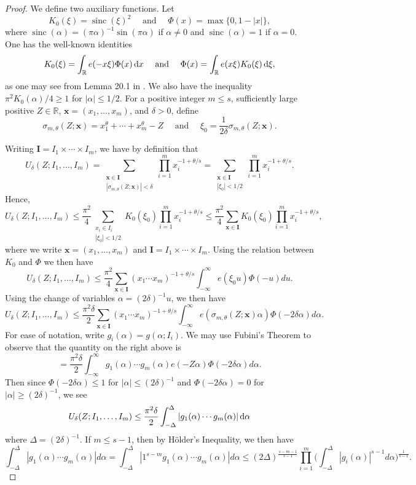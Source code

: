 \documentclass[11pt,reqno]{amsart}
\numberwithin{equation}{section}
\renewcommand{\d}{\,{\rm d}}
\begin{document}
\begin{proof}
We define two auxiliary functions. Let 
\[ K_0(\xi) = \operatorname{sinc}(\xi)^2 \quad \text{ and } \quad \Phi(x) = \max\{0, 1-|x| \}, \]
where $\operatorname{sinc}(\alpha) = (\pi \alpha)^{-1}\sin(\pi\alpha)$ if $\alpha \neq 0$ and $\operatorname{sinc}(\alpha) = 1$ if $\alpha=0$. One has the well-known identities
\[ K_0(\xi) = \int_{\mathbb{R}} e(-x\xi)\Phi(x)\d x \quad \text{ and } \quad \Phi(x) = \int_{\mathbb{R}} e(x\xi)K_0(\xi)\d\xi, \]
as one may see from Lemma 20.1 in \cite{DavBook}. We also have the inequality $\pi^2K_0(\alpha)/4 \geq 1$ for $|\alpha|\leq 1/2$. For a positive integer $m \leq s$, sufficiently large positive $Z \in \mathbb{R}$, $\mathbf{x} = (x_1,\ldots,x_m)$,  and $\delta > 0$, define 
\[ \sigma_{m,\theta}(Z; \mathbf{x}) = x_1^{\theta}+\cdots+x_m^{\theta}-Z \quad \text{ and } \quad \xi_0 = \frac{1}{2\delta}\sigma_{m,\theta}(Z; \mathbf{x}). \]

Writing $\mathbf{I} = I_1\times\cdots\times I_m$, we have by definition that 
\[ U_{\delta}(Z; I_1,\ldots,I_m) = \sum_{\substack{\mathbf{x} \in \mathbf{I} \\ |\sigma_{m,\theta}(Z; \mathbf{x})| < \delta }} \prod_{i=1}^{m} x_i^{-1+\theta/s} = \sum_{\substack{\mathbf{x} \in \mathbf{I} \\ |\xi_0| < 1/2 }} \prod_{i=1}^{m} x_i^{-1+\theta/s}. \]
Hence, 
\[ U_{\delta}(Z; I_1,\ldots,I_m) \leq \frac{\pi^2}{4}\sum_{\substack{x_i \in I_i \\ |\xi_0| < 1/2 }} K_0(\xi_0) \prod_{i=1}^{m} x_i^{-1+\theta/s} \leq \frac{\pi^2}{4}\sum_{\mathbf{x} \in \mathbf{I}} K_0(\xi_0) \prod_{i=1}^{m} x_i^{-1+\theta/s}, \]
where we write $\mathbf{x} = (x_1,\ldots,x_m)$ and $\mathbf{I} = I_1 \times \cdots \times I_m$. Using the relation between $K_0$ and $\Phi$ we then have 
\[ U_{\delta}(Z; I_1,\ldots,I_m) \leq \frac{\pi^2}{4} \sum_{\mathbf{x} \in \mathbf{I}}(x_1\cdots x_m)^{-1+\theta/s} \int_{-\infty}^{\infty} e(\xi_0u)\Phi(-u)du. \]
Using the change of variables $\alpha = (2\delta)^{-1}u$, we then have 
\[ U_{\delta}(Z; I_1,\ldots,I_m) \leq \frac{\pi^2\delta}{2} \sum_{\mathbf{x} \in \mathbf{I}}(x_1\cdots x_m)^{-1+\theta/s} \int_{-\infty}^{\infty} e(\sigma_{m,\theta}(Z; \mathbf{x})\alpha)\Phi(-2\delta\alpha)d\alpha. \]
For ease of notation, write $g_i(\alpha) = g(\alpha;I_i)$. 
We may use Fubini's Theorem to observe that the quantity on the right above is 
\[ = \frac{\pi^2\delta}{2} \int_{-\infty}^{\infty}g_1(\alpha)\cdots g_m(\alpha)e(-Z\alpha)\Phi(-2\delta\alpha)d\alpha. \]
Then since $\Phi(-2\delta\alpha) \leq 1$ for $|\alpha| \leq (2\delta)^{-1}$ and $\Phi(-2\delta\alpha) = 0$ for $|\alpha| \geq (2\delta)^{-1}$, we see 
\[ U_{\delta}(Z; I_1,\ldots,I_m) \leq \frac{\pi^2\delta}{2} \int_{-\Delta}^{\Delta}|g_1(\alpha)\cdots g_m(\alpha)|\d\alpha \]
where $\Delta = (2\delta)^{-1}$. If $m \leq s-1$, then by H\"{o}lder's Inequality, we then have 
\[ \int_{-\Delta}^{\Delta}|g_1(\alpha)\cdots g_m(\alpha)|d\alpha = \int_{-\Delta}^{\Delta}|1^{s-m}g_1(\alpha)\cdots g_m(\alpha)|d\alpha \leq (2\Delta)^{\frac{s-m-1}{s-1}} \prod_{i=1}^m \big( \int_{-\Delta}^{\Delta} |g_i(\alpha)|^{s-1} d\alpha \big)^{\frac{1}{s-1}}. \]


\end{proof}
\end{document}
